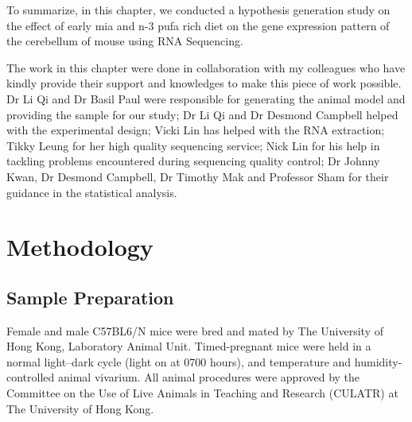 To summarize, in this chapter, we conducted a hypothesis generation study on the effect of early \gls{mia} and n-3 \gls{pufa} rich diet on the gene expression pattern of the cerebellum of mouse using RNA Sequencing.

The work in this chapter were done in collaboration with my colleagues who have kindly provide their support and knowledges to make this piece of work possible.
Dr Li Qi and Dr Basil Paul were responsible for generating the animal model and providing the sample for our study;
Dr Li Qi and Dr Desmond Campbell helped with the experimental design;
Vicki Lin has helped with the RNA extraction; 
Tikky Leung for her high quality sequencing service;
Nick Lin for his help in tackling problems encountered during sequencing quality control; 
Dr Johnny Kwan, Dr Desmond Campbell, Dr Timothy Mak and Professor Sham for their guidance in the statistical analysis.

\section{Methodology}
\subsection{Sample Preparation}
Female and male C57BL6/N mice were bred and mated by The University of Hong Kong, Laboratory Animal Unit. 
Timed-pregnant mice were held in a normal light–dark cycle (light on at 0700 hours), and temperature and humidity-controlled animal vivarium. 
All animal procedures were approved by the Committee on the Use of Live Animals in Teaching and Research (CULATR) at The University of Hong Kong.

